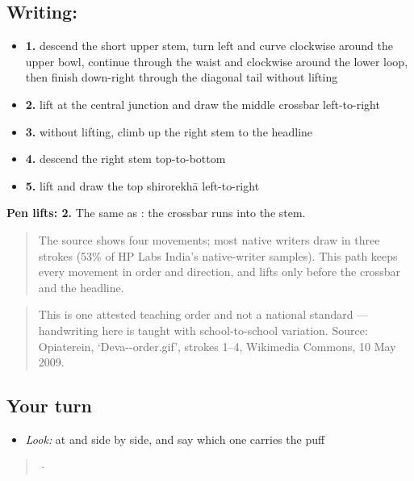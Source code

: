 \subsection*{Writing: }

\begin{itemize}
\raggedright
  \item \textbf{1.} descend the short upper stem, turn left and curve clockwise around the upper bowl, continue through the waist and clockwise around the lower loop, then finish down-right through the diagonal tail without lifting
  \item \textbf{2.} lift at the central junction and draw the middle crossbar left-to-right
  \item \textbf{3.} without lifting, climb up the right stem to the headline
  \item \textbf{4.} descend the right stem top-to-bottom
  \item \textbf{5.} lift and draw the top shirorekhā left-to-right
\end{itemize}

\textbf{Pen lifts: 2.} The same as \textbf{}: the crossbar runs into the stem.

\begin{quote}
The source shows four movements; most native writers draw  in three strokes (53\% of HP Labs India's native-writer samples). This path keeps every movement in order and direction, and lifts only before the crossbar and the headline.
\end{quote}

\begin{quote}
This is one attested teaching order and not a national standard — handwriting here is taught with school-to-school variation. Source: Opiaterein, ‘Deva--order.gif’, strokes 1–4, Wikimedia Commons, 10 May 2009.
\end{quote}

\subsection*{Your turn}
\begin{itemize}
\raggedright
  \item \emph{Look:} at  and  side by side, and say which one carries the puff
\end{itemize}

\begin{quote}
  ·  
\end{quote}


